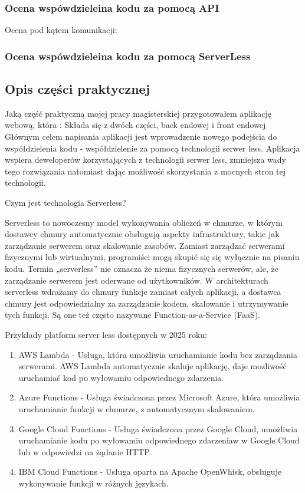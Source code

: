 \documentclass[runningheads,12pt]{llncs}
\begin{document}
\subsubsection{Ocena wspówdzieleina kodu za pomocą API}

Ocena pod kątem komunikacji: 

\subsubsection{Ocena wspówdzieleina kodu za pomocą ServerLess}

\subsection{Opis części praktycznej}

Jaką część praktyczną mojej pracy magisterskiej przygotowałem aplikację webową, która : 
Składa się z dwóch części, back endowej i front endowej 
Głównym celem napisania aplikacji jest wprowadzenie nowego podejścia do współdzielenia kodu - współdzielenie za pomocą technologii serwer less. Aplikacja wspiera deweloperów korzystających z technologii serwer less, zmniejsza wady tego rozwiązania natomiast dając możliwość skorzystania z mocnych stron tej technologii.  

Czym jest technologia Serverless?

Serverless to nowoczesny model wykonywania obliczeń w chmurze, w którym dostawcy chmury automatycznie obsługują aspekty infrastruktury, takie jak zarządzanie serwerem oraz skalowanie zasobów. Zamiast zarządzać serwerami fizycznymi lub wirtualnymi, programiści mogą skupić się się wyłącznie na pisaniu kodu. Termin „serverless” nie oznacza że niema fizycznych serwerów, ale, że zarządzanie serwerem jest oderwane od użytkowników. W architekturach serverless wdrażamy do chmury funkcje zamiast całych aplikacji, a dostawca chmury jest odpowiedzialny za zarządzanie kodem, skalowanie i utrzymywanie tych funkcji. Są one też często nazywane Function-as-a-Service (FaaS).

Przykłady platform server less dostępnych w 2025 roku:

\begin{enumerate}
    \item AWS Lambda - Usługa, która umożliwia uruchamianie kodu bez zarządzania serwerami. AWS Lambda automatycznie skaluje aplikację, daje mozliwość uruchamiać kod po wyłowamiu odpowiednego zdarzenia.
    \item Azure Functions - Usługa świadczona przez Microsoft Azure, która umożliwia uruchamianie funkcji w chmurze, z automatycznym skalowaniem.
    \item Google Cloud Functions - Usługa świadczona przez Google Cloud, umożliwia uruchamianie kodu po wyłowamiu odpowiednego zdarzeniaw w Google Cloud lub w odpowiedzi na żądanie HTTP.
    \item IBM Cloud Functions - Usługa oparta na Apache OpenWhisk, obsługuje wykonywanie funkcji w różnych językach.
\end{enumerate}
\end{document}
